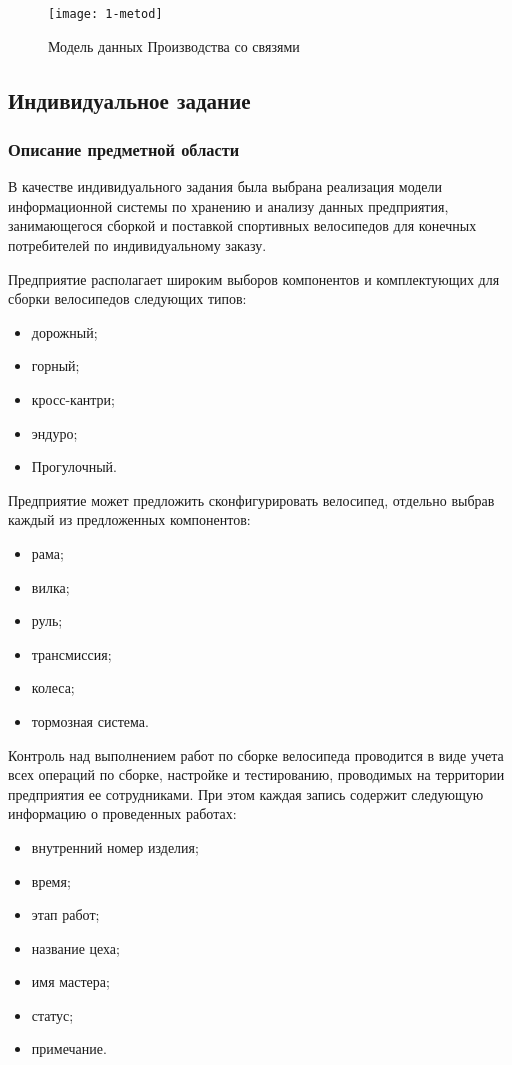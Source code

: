 \begin{figure}[ht]
	\centering
	\texttt{[image: 1-metod]}
	\caption{Модель данных Производства со связями}
	\label{fig:1-metod}
\end{figure}
\subsection{Индивидуальное задание}
\subsubsection*{Описание предметной области}
В качестве индивидуального задания была выбрана реализация модели информационной системы по хранению и анализу данных  предприятия, занимающегося сборкой и поставкой спортивных велосипедов для конечных потребителей по индивидуальному заказу.

Предприятие располагает широким выборов компонентов и комплектующих для сборки велосипедов следующих типов:
\begin{itemize}
	\item дорожный;
	\item горный;
	\item кросс-кантри;
	\item эндуро;
	\item Прогулочный.
\end{itemize}

Предприятие может предложить сконфигурировать велосипед, отдельно выбрав каждый из предложенных компонентов:
\begin{itemize}
	\item рама;
	\item вилка;
	\item руль;
	\item трансмиссия;
	\item колеса;
	\item тормозная система.
\end{itemize}

Контроль над выполнением работ по сборке велосипеда проводится в виде учета всех операций по сборке, настройке и тестированию, проводимых на территории предприятия ее сотрудниками. При этом каждая запись содержит следующую информацию о проведенных работах:
\begin{itemize}
	\item внутренний номер изделия;
	\item время;
	\item этап работ;
	\item название цеха;
	\item имя мастера;
	\item статус;
	\item примечание.
\end{itemize}

